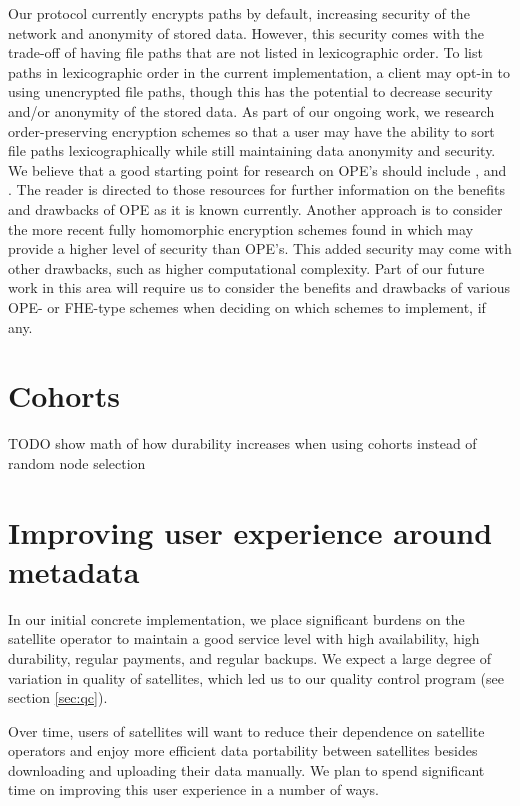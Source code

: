 \documentclass[11pt,fleqn,openany]{book}
\newcommand{\todo}[1]{{\color{red} TODO #1 }}
\begin{document}
Our protocol currently encrypts paths by default,
increasing security of the network and anonymity of stored data.
However, this security comes with the trade-off of having file paths
that are not listed in lexicographic order.
To list paths in lexicographic order in the current implementation,
a client may opt-in to using unencrypted file paths,
though this has the potential to decrease security
and/or anonymity of the stored data.
As part of our ongoing work,
we research
order-preserving encryption schemes
\cite{Agrawal:2004:OPE:1007568.1007632} so that a user may have
the ability to sort file paths lexicographically
while still maintaining data anonymity and security.
We believe that a good starting point for research on OPE's
should include \cite{7815719}, and \cite{10.1007/978-3-642-22792-9_33}.
The reader is directed to those resources for further information
on the benefits and drawbacks of OPE as it is known currently.
Another approach is to consider the more recent fully
homomorphic encryption schemes found in \cite{gentry2015fully}
which may provide a higher level of security than OPE's.
This added security may come with other drawbacks,
such as higher computational complexity.
Part of our future work in this area will require us to consider
the benefits and drawbacks of various OPE- or FHE-type schemes
when deciding on which schemes to implement, if any.

\section{Cohorts}

\todo{show math of how durability increases when using cohorts instead of
  random node selection}

\section{Improving user experience around metadata}\label{sec:distributed-metadata}

In our initial concrete implementation, we place significant burdens on the
satellite operator to maintain a good service level with high availability,
high durability, regular payments, and regular backups. We expect a large
degree of variation in quality of satellites, which led us to our quality
control program (see section \ref{sec:qc}).

Over time, users of satellites will want to reduce their dependence on satellite
operators and enjoy more efficient data portability between satellites besides
downloading and uploading their data manually. We plan to spend significant time
on improving this user experience in a number of ways.
\end{document}
